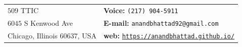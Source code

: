 \documentclass[margin,line]{res}
\begin{document}
\begin{resume}
\section{\large {}}
\begin{tabular}{@{}p{3in}p{2.84in}}
$509$ TTIC          & \hfill {\bf Voice:}  {\tt (217) 904-5911}\\            
$6045$ S Kenwood Ave    & \hfill {\bf E-mail:} {\tt anandbhattad92@gmail.com}\\         
Chicago, Illinois $60637$, USA  &\hfill  {\bf web:} \href{https://anandbhattad.github.io/}{\tt https://anandbhattad.github.io/}\\     
\end{tabular}



\end{resume}
\end{document}
